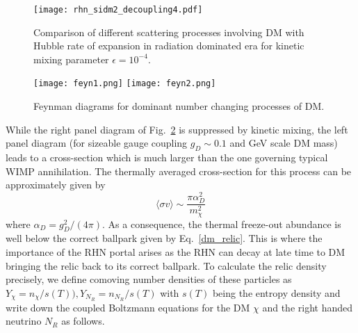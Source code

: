 \documentclass[prd,nofootinbib,preprint,superscriptaddress]{revtex4}
\begin{document}
		\begin{figure}
			\centering
			\texttt{[image: rhn\_sidm2\_decoupling4.pdf]}
			\caption{Comparison of different scattering processes involving DM with Hubble rate of expansion in radiation dominated era for kinetic mixing parameter $\epsilon = 10^{-4}$.}
			\label{decoupling4}
		\end{figure}
		
		\begin{figure}[ht]
			\texttt{[image: feyn1.png]} 
			\hfil
			\texttt{[image: feyn2.png]}
			\caption{Feynman diagrams for dominant number changing processes of DM.}
			\label{feyn}
		\end{figure}
		While the right panel diagram of Fig.~\ref{feyn} is suppressed by kinetic mixing, the left panel diagram (for sizeable gauge coupling $g_D \sim 0.1$ and GeV scale DM mass) leads to a cross-section which is much larger than the one governing typical WIMP annihilation. The thermally averaged cross-section for this process can be approximately given by
		\begin{equation}
			\langle\sigma v\rangle \sim \frac{\pi \alpha^2_D}{m^2_{\chi}}
		\end{equation}
		where $\alpha_D=g^2_D/(4\pi) $. As a consequence, the thermal freeze-out abundance is well below the correct ballpark given by Eq.~\eqref{dm_relic}. This is where the importance of the RHN portal arises as the RHN can decay at late time to DM bringing the relic back to its correct ballpark. To calculate the relic density precisely, we define comoving number densities of these particles as $Y_{\chi}=n_{\chi}/s(T)), Y_{N_{R}} = n_{N_{R}}/s(T)$ with $s(T)$ being the entropy density and write down the coupled Boltzmann equations for the DM $\chi$ and the right handed neutrino $N_{R}$ as follows. 
		
\end{document}
